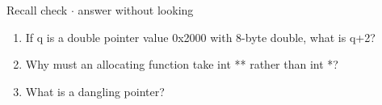 \documentclass[11pt]{article}
\begin{document}
\begin{keepsection}
\begin{keepsection}
\begin{recallbox}{Recall check \ensuremath{\cdot} answer without looking}
\begin{enumerate}
\item If q is a double pointer value 0x2000 with 8-byte double, what is q+2?
\item Why must an allocating function take int ** rather than int *?
\item What is a dangling pointer?
\end{enumerate}

\end{recallbox}
\end{keepsection}
\end{keepsection}
\end{document}
